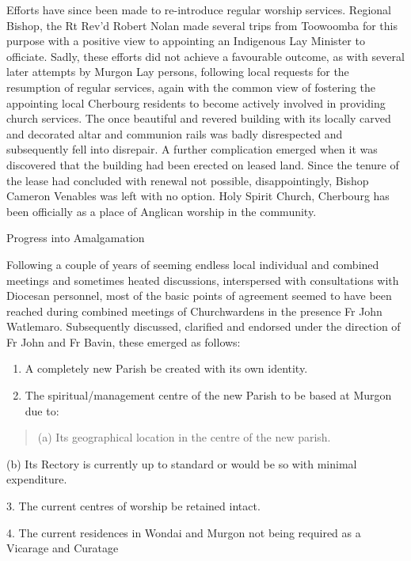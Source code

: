 Efforts have since been made to re-introduce regular worship services. Regional Bishop, the Rt Rev'd Robert Nolan made several trips from Toowoomba for this purpose with a positive view to appointing an Indigenous Lay Minister to officiate. Sadly, these efforts did not achieve a favourable outcome, as with several later attempts by Murgon Lay persons, following local requests for the resumption of regular services, again with the common view of fostering the appointing local Cherbourg residents to become actively involved in providing church services. The once beautiful and revered building with its locally carved and decorated altar and communion rails was badly disrespected and subsequently fell into disrepair. A further complication emerged when it was discovered that the building had been erected on leased land. Since the tenure of the lease had concluded with renewal not possible, disappointingly, Bishop Cameron Venables was left with no option. Holy Spirit Church, Cherbourg has been officially as a place of Anglican worship in the community.

Progress into Amalgamation

Following a couple of years of seeming endless local individual and combined meetings and sometimes heated discussions, interspersed with consultations with Diocesan personnel, most of the basic points of agreement seemed to have been reached during combined meetings of Churchwardens in the presence Fr John Watlemaro. Subsequently discussed, clarified and endorsed under the direction of Fr John and Fr Bavin, these emerged as follows:

\begin{enumerate}
\def\labelenumi{\arabic{enumi}.}
\item
  A completely new Parish be created with its own identity.
\item
  The spiritual/management centre of the new Parish to be based at Murgon due to:
\end{enumerate}

\begin{quote}
(a) Its geographical location in the centre of the new parish.
\end{quote}

(b) Its Rectory is currently up to standard or would be so with minimal expenditure.

3. The current centres of worship be retained intact.

4. The current residences in Wondai and Murgon not being required as a Vicarage and Curatage


